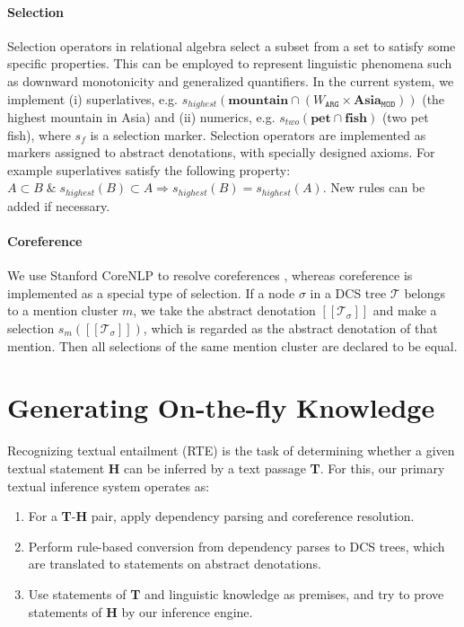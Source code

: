 \documentclass[11pt]{article}
\def\den#1{[\![#1]\!]}
\begin{document}
\paragraph{Selection}
Selection operators in relational algebra select a subset from a set to satisfy some specific
properties. This can be employed to represent linguistic phenomena such as 
downward monotonicity and 
generalized quantifiers. In the current system, we implement (i) 
superlatives, 
e.g. $s_{highest}(\textbf{mountain}\cap(W_{\texttt{ARG}}\times \textbf{Asia}_{\texttt{MOD}}))$ 
(the highest mountain in Asia) and (ii) numerics, e.g. $s_{two}(\textbf{pet}\cap\textbf{fish})$ 
(two pet fish), where $s_f$ is a selection marker.
Selection operators are implemented as markers assigned to abstract denotations, 
with specially designed axioms. For example 
superlatives satisfy the following property: 
$A\subset B \;\&\; s_{highest}(B)\subset A \Rightarrow s_{highest}(B)=s_{highest}(A)$. 
New rules can be added if necessary. 

\paragraph{Coreference}
We use Stanford CoreNLP to resolve coreferences \cite{raghunathan10}, 
whereas coreference is implemented as a special type of selection. 
If a node $\sigma$ in a DCS tree $\mathcal{T}$ belongs to a mention cluster $m$, 
we take the abstract denotation $\den{\mathcal{T}_{\sigma}}$ and make a selection 
$s_{m}(\den{\mathcal{T}_{\sigma}})$, which is regarded as the abstract denotation 
of that mention. Then all selections of the same mention cluster are declared to be equal. 

\section{Generating On-the-fly Knowledge}
\label{sec:sysoverview}

Recognizing textual entailment (RTE) is the task of determining whether a given textual 
statement {\bf H} can be inferred by a text passage {\bf T}. For this, 
our primary textual inference system operates as: 

\begin{enumerate}
\item For a {\bf T}-{\bf H} pair, apply dependency parsing and coreference resolution.
\item Perform rule-based conversion from dependency parses to DCS trees, which are 
translated to statements on abstract denotations.
\item Use statements of {\bf T} and linguistic knowledge as premises, and try to prove 
statements of {\bf H} by our inference engine.
\end{enumerate}
\end{document}
